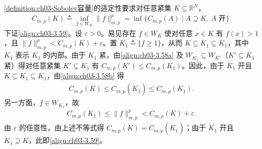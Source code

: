 \documentclass[../../main.tex]{subfiles}%
\begin{document}
\begin{remark}\label{remark:ch03-容量定义适定}
\cref{definition:ch03-Sobolev容量}的适定性要求对任意紧集 $K\subseteq\mathbb{R}^N$，
\begin{align}
C_{m,p}(K)\triangleq \inf_{f\in W_K}\|f\|_{m,p}^p=\inf\{C_{m,p}(A)\mid A\supseteq K,\ A\text{ 开}\}.\label{align:ch03-3.59}
\end{align}
下证\eqref{align:ch03-3.59}。设 $\varepsilon>0$。易见存在 $f\in W_K$ 使对任意 $x\in K$ 有 $f(x)>1$，且 $\|f\|_{m,p}^p<C_{m,p}(K)+\varepsilon$。置 $K_1\triangleq \{f\geqslant1\}$，从而 $K\subseteq\mathring K_1\subseteq K_1$，其中 $\mathring K_1$ 表示 $K_1$ 的内部。由于 $K_1$ 紧，由\eqref{align:ch03-3.58a} 及 $W_{K_1}\subseteq W_{K'}$（$K'\subseteq K_1$ 紧）得对任意紧集 $K'\subseteq K_1$ 有 $C_{m,p}(K')\leqslant C_{m,p}(K_1)$。因此，由于 $\mathring K_1$ 开且 $K\subseteq\mathring K_1\subseteq K_1$，由\eqref{align:ch03-3.58b} 得
\begin{align*}
C_{m,p}(K)\leqslant C_{m,p}(\mathring K_1)\leqslant C_{m,p}(K_1).
\end{align*}
另一方面，$f\in W_{K_1}$，故
\begin{align*}
C_{m,p}(K_1)\leqslant\|f\|_{m,p}^p<C_{m,p}(K)+\varepsilon.
\end{align*}
由 $\varepsilon$ 的任意性，由上述不等式得 $C_{m,p}(K)=C_{m,p}(\mathring K_1)$；由于 $\mathring K_1$ 开且 $\mathring K_1\supseteq K$，此即\eqref{align:ch03-3.59}。
\end{remark}
\end{document}
